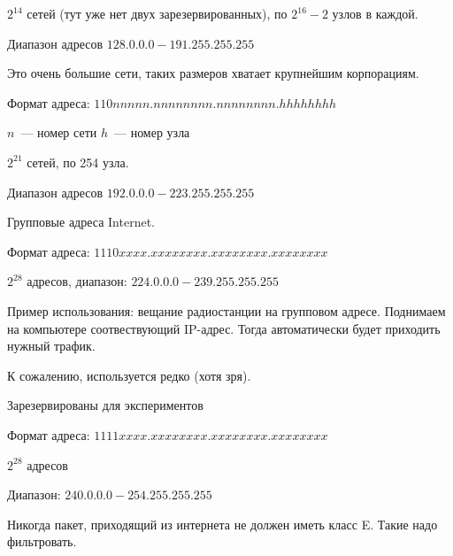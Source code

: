 $2^{14}$ сетей (тут уже нет двух зарезервированных), по $2^{16}-2$ узлов в каждой.

Диапазон адресов $128.0.0.0-191.255.255.255$

Это очень большие сети, таких размеров хватает крупнейшим корпорациям.


Формат адреса: $110nnnnn.nnnnnnnn.nnnnnnnn.hhhhhhhh$

$n$~--- номер сети
$h$~--- номер узла

$2^{21}$ сетей, по 254 узла.

Диапазон адресов $192.0.0.0-223.255.255.255$


Групповые адреса Internet.

Формат адреса: $1110xxxx.xxxxxxxx.xxxxxxxx.xxxxxxxx$

$2^{28}$ адресов, диапазон: $224.0.0.0 - 239.255.255.255$

Пример использования: вещание радиостанции на групповом адресе. Поднимаем на компьютере соотвествующий IP-адрес. Тогда автоматически будет приходить нужный трафик.

К сожалению, используется редко (хотя зря).


Зарезервированы для экспериментов

Формат адреса: $1111xxxx.xxxxxxxx.xxxxxxxx.xxxxxxxx$

$2^{28}$ адресов

Диапазон: $240.0.0.0-254.255.255.255$

Никогда пакет, приходящий из интернета не должен иметь класс E. Такие надо фильтровать.


